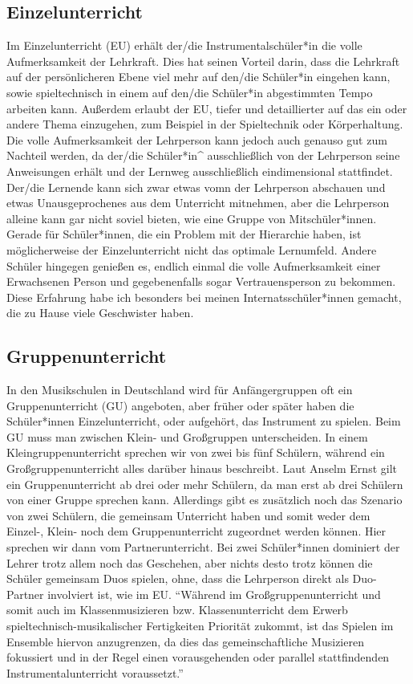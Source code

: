 \subsection{Einzelunterricht}
Im Einzelunterricht (EU) erhält der/die Instrumentalschüler*in die volle Aufmerksamkeit
der Lehrkraft. Dies hat seinen Vorteil darin, dass die Lehrkraft auf der
persönlicheren Ebene viel mehr auf den/die Schüler*in eingehen kann, sowie
spieltechnisch in einem auf den/die Schüler*in abgestimmten Tempo arbeiten kann.
Außerdem erlaubt der EU, tiefer und detaillierter auf das ein oder andere Thema
einzugehen, zum Beispiel in der Spieltechnik oder Körperhaltung. Die volle
Aufmerksamkeit der Lehrperson kann jedoch auch genauso gut zum Nachteil werden, da
der/die Schüler*in^{} ausschließlich von der Lehrperson seine Anweisungen erhält und der
Lernweg ausschließlich eindimensional stattfindet. Der/die Lernende kann sich zwar
etwas vomn der Lehrperson abschauen und etwas
Unausgeprochenes aus dem Unterricht mitnehmen, aber die Lehrperson alleine kann gar
nicht soviel bieten, wie eine Gruppe von Mitschüler*innen. Gerade für Schüler*innen, die
ein Problem mit der Hierarchie haben, ist möglicherweise der Einzelunterricht
nicht das optimale Lernumfeld. Andere Schüler hingegen genießen es, endlich
einmal die volle Aufmerksamkeit einer Erwachsenen Person und gegebenenfalls
sogar Vertrauensperson zu bekommen. Diese Erfahrung habe ich besonders bei
meinen Internatsschüler*innen gemacht, die zu Hause
viele Geschwister haben. 

\subsection{Gruppenunterricht} 
In den Musikschulen in Deutschland wird für Anfängergruppen oft ein
Gruppenunterricht (GU) angeboten, aber früher oder später haben die
Schüler*innen Einzelunterricht, oder aufgehört, das Instrument zu spielen.
Beim GU muss man zwischen Klein- und Großgruppen unterscheiden.
In einem Kleingruppenunterricht sprechen wir von zwei bis fünf Schülern, während
ein Großgruppenunterricht alles darüber hinaus beschreibt.
\autocite[219]{busch:grundwissen_instrumentalpaedagogik} Laut Anselm Ernst gilt
ein Gruppenunterricht ab drei oder mehr Schülern, da man erst ab drei Schülern
von einer Gruppe sprechen kann.
\autocite[79]{ernst:die_zukunftsfaehige_musikschule}
Allerdings gibt es zusätzlich noch das Szenario von zwei Schülern, die gemeinsam
Unterricht haben und somit weder dem Einzel-, Klein- noch dem Gruppenunterricht
zugeordnet werden können. Hier sprechen wir dann vom
Partnerunterricht.\autocite[219]{busch:grundwissen_instrumentalpaedagogik} Bei
zwei Schüler*innen dominiert der Lehrer trotz allem noch das Geschehen, aber nichts
desto trotz können die Schüler gemeinsam Duos spielen, ohne, dass die Lehrperson
direkt als Duo-Partner involviert ist, wie im EU. \enquote{Während im
Großgruppenunterricht und somit auch im Klassenmusizieren bzw. Klassenunterricht
dem Erwerb spieltechnisch-musikalischer Fertigkeiten Priorität zukommt, ist das
Spielen im Ensemble hiervon anzugrenzen, da dies das gemeinschaftliche
Musizieren fokussiert und in der Regel einen vorausgehenden oder parallel
stattfindenden Instrumentalunterricht
voraussetzt.}\autocite[219]{busch:grundwissen_instrumentalpaedagogik}

